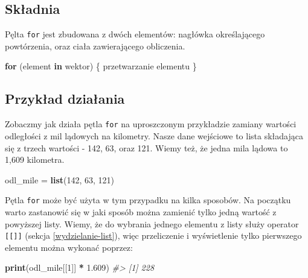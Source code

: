 \documentclass[paper=6in:9in,pagesize=pdftex,headinclude=on,footinclude=on,10pt]{scrbook}
\newenvironment{Shaded}{\begin{snugshade}}{\end{snugshade}}
\newcommand{\CommentTok}[1]{\textcolor[rgb]{0.56,0.35,0.01}{\textit{#1}}}
\newcommand{\ControlFlowTok}[1]{\textcolor[rgb]{0.13,0.29,0.53}{\textbf{#1}}}
\newcommand{\DecValTok}[1]{\textcolor[rgb]{0.00,0.00,0.81}{#1}}
\newcommand{\FloatTok}[1]{\textcolor[rgb]{0.00,0.00,0.81}{#1}}
\newcommand{\KeywordTok}[1]{\textcolor[rgb]{0.13,0.29,0.53}{\textbf{#1}}}
\newcommand{\NormalTok}[1]{#1}
\newcommand{\OperatorTok}[1]{\textcolor[rgb]{0.81,0.36,0.00}{\textbf{#1}}}
\newcommand{\StringTok}[1]{\textcolor[rgb]{0.31,0.60,0.02}{#1}}
\begin{document}
\hypertarget{skux142adnia}{%
\subsection{Składnia}\label{skux142adnia}}

Pęlta \texttt{for} jest zbudowana z dwóch elementów: nagłówka określającego powtórzenia, oraz ciała zawierającego obliczenia.

\begin{Shaded}
\begin{Highlighting}[]
\ControlFlowTok{for}\NormalTok{ (element }\ControlFlowTok{in}\NormalTok{ wektor) \{}
\NormalTok{  przetwarzanie elementu}
\NormalTok{\}}
\end{Highlighting}
\end{Shaded}

\hypertarget{for-example}{%
\subsection{Przykład działania}\label{for-example}}

Zobaczmy jak działa pętla \texttt{for} na uproszczonym przykładzie zamiany wartości odległości z mil lądowych na kilometry.
Nasze dane wejściowe to lista składająca się z trzech wartości - 142, 63, oraz 121.
Wiemy też, że jedna mila lądowa to 1,609 kilometra.

\begin{Shaded}
\begin{Highlighting}[]
\NormalTok{odl_mile =}\StringTok{ }\KeywordTok{list}\NormalTok{(}\DecValTok{142}\NormalTok{, }\DecValTok{63}\NormalTok{, }\DecValTok{121}\NormalTok{)}
\end{Highlighting}
\end{Shaded}

Pętla \texttt{for} może być użyta w tym przypadku na kilka sposobów.
Na początku warto zastanowić się w jaki sposób można zamienić tylko jedną wartość z powyższej listy.
Wiemy, że do wybrania jednego elementu z listy służy operator \texttt{{[}{[}{]}{]}} (sekcja \ref{wydzielanie-list}), więc przeliczenie i wyświetlenie tylko pierwszego elementu można wykonać poprzez:

\begin{Shaded}
\begin{Highlighting}[]
\KeywordTok{print}\NormalTok{(odl_mile[[}\DecValTok{1}\NormalTok{]] }\OperatorTok{*}\StringTok{ }\FloatTok{1.609}\NormalTok{)}
\CommentTok{#> [1] 228}
\end{Highlighting}
\end{Shaded}
\end{document}
